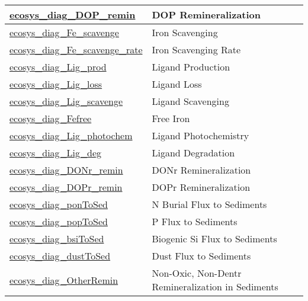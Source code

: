 {\begin{center}
\begin{longtable}{| p{2.0in} | p{4.0in} |}
    \hline
    \hyperref[subsec:var_sec_forcing_ecosys_diag_DOP_remin]{ecosys\_diag\_DOP\_remin} & DOP Remineralization \\
    \hline
    \hyperref[subsec:var_sec_forcing_ecosys_diag_Fe_scavenge]{ecosys\_diag\_Fe\_scavenge} & Iron Scavenging \\
    \hline
    \hyperref[subsec:var_sec_forcing_ecosys_diag_Fe_scavenge_rate]{ecosys\_diag\_Fe\_scavenge\_rate} & Iron Scavenging Rate \\
    \hline
    \hyperref[subsec:var_sec_forcing_ecosys_diag_Lig_prod]{ecosys\_diag\_Lig\_prod} & Ligand Production \\
    \hline
    \hyperref[subsec:var_sec_forcing_ecosys_diag_Lig_loss]{ecosys\_diag\_Lig\_loss} & Ligand Loss \\
    \hline
    \hyperref[subsec:var_sec_forcing_ecosys_diag_Lig_scavenge]{ecosys\_diag\_Lig\_scavenge} & Ligand Scavenging \\
    \hline
    \hyperref[subsec:var_sec_forcing_ecosys_diag_Fefree]{ecosys\_diag\_Fefree} & Free Iron \\
    \hline
    \hyperref[subsec:var_sec_forcing_ecosys_diag_Lig_photochem]{ecosys\_diag\_Lig\_photochem} & Ligand Photochemistry \\
    \hline
    \hyperref[subsec:var_sec_forcing_ecosys_diag_Lig_deg]{ecosys\_diag\_Lig\_deg} & Ligand Degradation \\
    \hline
    \hyperref[subsec:var_sec_forcing_ecosys_diag_DONr_remin]{ecosys\_diag\_DONr\_remin} & DONr Remineralization \\
    \hline
    \hyperref[subsec:var_sec_forcing_ecosys_diag_DOPr_remin]{ecosys\_diag\_DOPr\_remin} & DOPr Remineralization \\
    \hline
    \hyperref[subsec:var_sec_forcing_ecosys_diag_ponToSed]{ecosys\_diag\_ponToSed} & N Burial Flux to Sediments \\
    \hline
    \hyperref[subsec:var_sec_forcing_ecosys_diag_popToSed]{ecosys\_diag\_popToSed} & P Flux to Sediments \\
    \hline
    \hyperref[subsec:var_sec_forcing_ecosys_diag_bsiToSed]{ecosys\_diag\_bsiToSed} & Biogenic Si Flux to Sediments \\
    \hline
    \hyperref[subsec:var_sec_forcing_ecosys_diag_dustToSed]{ecosys\_diag\_dustToSed} & Dust Flux to Sediments \\
    \hline
    \hyperref[subsec:var_sec_forcing_ecosys_diag_OtherRemin]{ecosys\_diag\_OtherRemin} & Non-Oxic, Non-Dentr Remineralization in Sediments \\

\end{longtable}
\end{center}}
